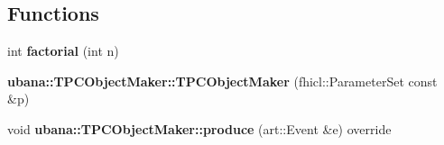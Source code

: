 \subsection*{Functions}
\begin{DoxyCompactItemize}
\item 
\hypertarget{group__UBXSec_gae1b37c26bb8e5744f5747d6cd6505356}{int {\bfseries factorial} (int n)}\label{group__UBXSec_gae1b37c26bb8e5744f5747d6cd6505356}

\item 
\hypertarget{group__UBXSec_ga2fa2477aabeb4c23aa6093ab805356dc}{{\bfseries ubana\-::\-T\-P\-C\-Object\-Maker\-::\-T\-P\-C\-Object\-Maker} (fhicl\-::\-Parameter\-Set const \&p)}\label{group__UBXSec_ga2fa2477aabeb4c23aa6093ab805356dc}

\item 
\hypertarget{group__UBXSec_ga89833cfc129f7410afb7622a8dbf45b3}{void {\bfseries ubana\-::\-T\-P\-C\-Object\-Maker\-::produce} (art\-::\-Event \&e) override}\label{group__UBXSec_ga89833cfc129f7410afb7622a8dbf45b3}


\end{DoxyCompactItemize}
